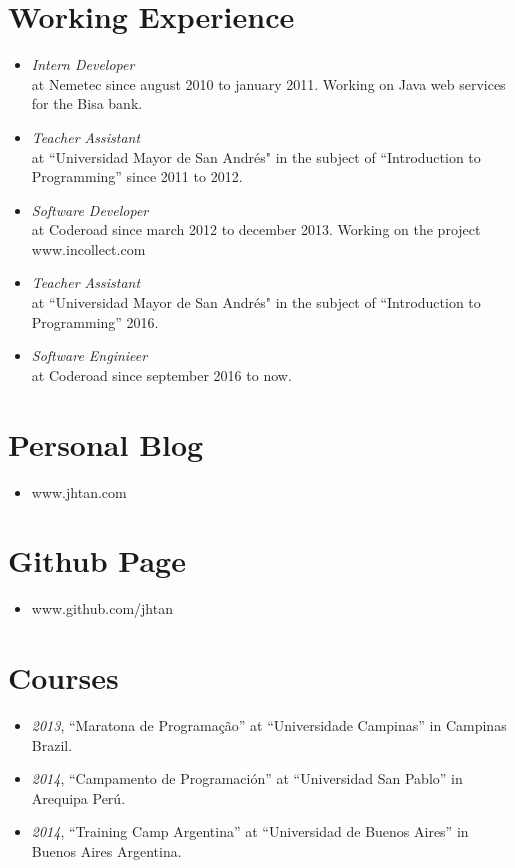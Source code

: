 \documentclass[margin, 10pt]{res} %
\begin{document}
\begin{resume}
\section{Working Experience}
\begin{itemize}
\item[] {\sl Intern Developer} \\
at Nemetec since august 2010 to january 2011. Working on Java web services for the Bisa bank. \\
\item[] {\sl Teacher Assistant} \\
at ``Universidad Mayor de San Andr\'es" in the subject of ``Introduction to Programming'' since 2011 to 2012. \\
\item[] {\sl Software Developer} \\
  at Coderoad since march 2012 to december 2013. Working on the project www.incollect.com \\
 \item[] {\sl Teacher Assistant} \\
   at ``Universidad Mayor de San Andr\'es" in the subject of ``Introduction to Programming'' 2016. \\
   \item[] {\sl Software Enginieer} \\
  at Coderoad since september 2016 to now.\\
\end{itemize}

\section{Personal Blog}
\begin{itemize}
\item[] www.jhtan.com
\end{itemize}

\section{Github Page}
\begin{itemize}
\item[] www.github.com/jhtan
\end{itemize}

\section{Courses}
\begin{itemize}
\item[] {\sl 2013}, ``Maratona de Programa\c{c}\~ao'' at ``Universidade Campinas'' in Campinas Brazil. \\
\item[] {\sl 2014}, ``Campamento de Programaci\'on'' at ``Universidad San Pablo'' in Arequipa Per\'u.\\
\item[] {\sl 2014}, ``Training Camp Argentina'' at ``Universidad de Buenos Aires'' in Buenos Aires Argentina.
\end{itemize}


\end{resume}
\end{document}

